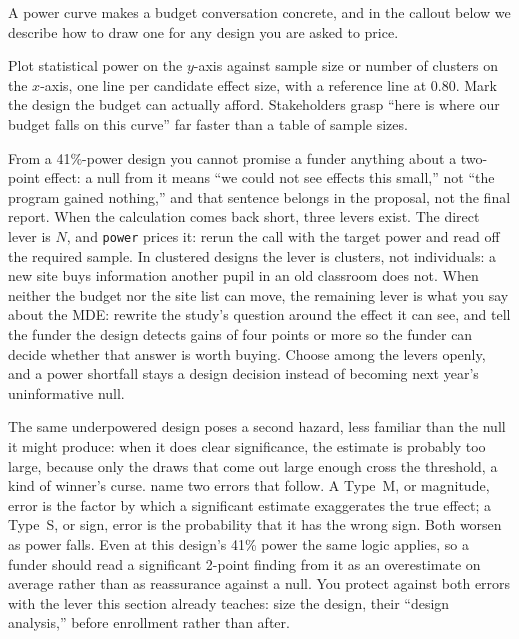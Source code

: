 A power curve makes a budget conversation concrete, and in the callout below we describe how to draw one for any design you are asked to price.

\begin{vizcallout}
Plot statistical power on the $y$-axis against sample size or number of clusters on the $x$-axis, one line per candidate effect size, with a reference line at 0.80. Mark the design the budget can actually afford. Stakeholders grasp \enquote{here is where our budget falls on this curve} far faster than a table of sample sizes.
\end{vizcallout}

From a 41\%-power design you cannot promise a funder anything about a two-point effect: a null from it means \enquote{we could not see effects this small,} not \enquote{the program gained nothing,} and that sentence belongs in the proposal, not the final report. When the calculation comes back short, three levers exist. The direct lever is $N$, and \texttt{power} prices it: rerun the call with the target power and read off the required sample. In clustered designs the lever is clusters, not individuals: a new site buys information another pupil in an old classroom does not. When neither the budget nor the site list can move, the remaining lever is what you say about the MDE: rewrite the study's question around the effect it can see, and tell the funder the design detects gains of four points or more so the funder can decide whether that answer is worth buying. Choose among the levers openly, and a power shortfall stays a design decision instead of becoming next year's uninformative null.

The same underpowered design poses a second hazard, less familiar than the null it might produce: when it does clear significance, the estimate is probably too large, because only the draws that come out large enough cross the threshold, a kind of winner's curse. \textcite{gelman2014power} name two errors that follow. A Type~M, or magnitude, error is the factor by which a significant estimate exaggerates the true effect; a Type~S, or sign, error is the probability that it has the wrong sign. Both worsen as power falls. Even at this design's 41\% power the same logic applies, so a funder should read a significant 2-point finding from it as an overestimate on average rather than as reassurance against a null. You protect against both errors with the lever this section already teaches: size the design, their \enquote{design analysis,} before enrollment rather than after.

